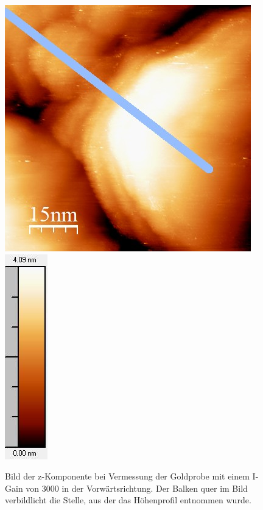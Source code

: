 \documentclass[12pt,a4paper]{article}
\begin{document}
\begin{figure}
\centering
\includegraphics[scale=0.8]{Bilder/Anhang/IGain/3000_IGain_vor.jpg}
\includegraphics[scale=0.8]{Bilder/Anhang/IGain/3000_IGain_vor_Skala.jpg}
\caption{Bild der z-Komponente bei Vermessung der Goldprobe mit einem I-Gain von 3000 in der Vorwärtsrichtung. Der Balken quer im Bild verbildlicht die Stelle, aus der das Höhenprofil entnommen wurde.}
\label{fig:Gold_IGain_Beispiel}
\end{figure}
\end{document}
